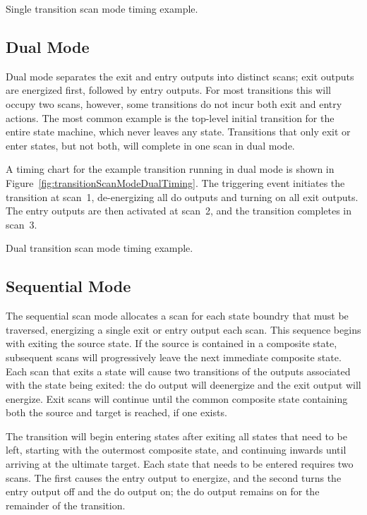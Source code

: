                {Single transition scan mode timing example.}


\subsection{Dual Mode}

Dual mode separates the exit and entry outputs into distinct scans;
exit outputs are energized first, followed by entry outputs.
For most transitions this will occupy two scans, however, some transitions
do not incur both exit and entry actions. The most common example is
the top-level initial transition for the entire state machine, which never
leaves any state. Transitions that only exit or enter states,
but not both, will complete in one scan in dual mode.

A timing chart for the example transition running in dual mode is shown
in Figure~\ref{fig:transitionScanModeDualTiming}. The triggering event
initiates the transition at scan~1, de-energizing all do outputs and turning
on all exit outputs. The entry outputs are then activated at scan~2, and
the transition completes in scan~3.

               {Dual transition scan mode timing example.}


\subsection{Sequential Mode}

The sequential scan mode allocates a scan for each state boundry that must
be traversed, energizing a single exit or entry output each
scan. This sequence begins with exiting the source state. If the source
is contained in a composite state, subsequent scans will progressively
leave the next immediate composite state. Each scan that exits a state will
cause two transitions of the outputs associated with the state being
exited: the do output will deenergize and the exit output will energize.
Exit scans will continue until the common composite state containing both
the source and target is reached, if one exists.

The transition will begin entering states after exiting all states that need
to be left, starting with the outermost composite state, and
continuing inwards until arriving at the ultimate target. Each state that
needs to be entered requires two scans. The first causes the entry output
to energize, and the second turns the entry output off and the do output on;
the do output remains on for the remainder of the transition.

